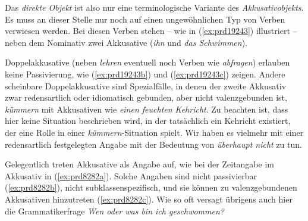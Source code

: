 \Np


Das \textit{direkte Objekt} ist also nur eine terminologische Variante des \textit{Akkusativobjekts}.
Es muss an dieser Stelle nur noch auf einen ungewöhnlichen Typ von Verben verwiesen werden.
Bei diesen Verben stehen -- wie in (\ref{ex:prd19243}) illustriert -- neben dem Nominativ zwei Akkusative (\textit{ihn} und \textit{das Schwimmen}).

\begin{exe}
  \ex\label{ex:prd19243}
  \begin{xlist}
  \end{xlist}
\end{exe}


Doppelakkusative (neben \textit{lehren} eventuell noch Verben wie \textit{abfragen}) erlauben keine Passivierung, wie (\ref{ex:prd19243b}) und (\ref{ex:prd19243c}) zeigen.
Andere scheinbare Doppelakkusative sind Spezialfälle, in denen der zweite Akkusativ zwar redensartlich oder idiomatisch gebunden, aber nicht valenzgebunden ist, \zB \textit{kümmern} mit Akkusativen wie \textit{einen feuchten Kehricht}.
Zu beachten ist, dass hier keine Situation beschrieben wird, in der tatsächlich ein Kehricht existiert, der eine Rolle in einer \textit{kümmern}-Situation spielt.
Wir haben es vielmehr mit einer redensartlich festgelegten Angabe mit der Bedeutung von \textit{überhaupt nicht} zu tun.

Gelegentlich treten Akkusative als Angabe auf, wie bei der Zeitangabe im Akkusativ in (\ref{ex:prd8282a}).
Solche Angaben sind nicht passivierbar (\ref{ex:prd8282b}), nicht subklassenspezifisch, und sie können zu valenzgebundenen Akkusativen hinzutreten (\ref{ex:prd8282c}).
Wie so oft versagt übrigens auch hier die Grammatikerfrage \textit{Wen oder was bin ich geschwommen?}

\begin{exe}
  \ex\label{ex:prd8282}
  \begin{xlist}
  \end{xlist} 
\end{exe}


